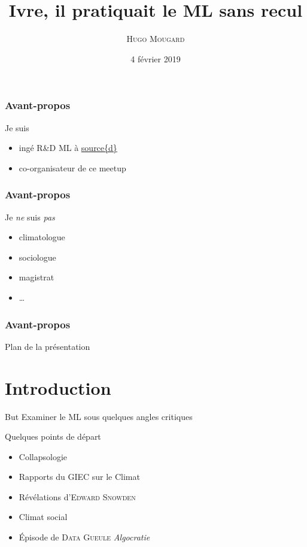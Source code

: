 \documentclass[10pt]{beamer}
\title{Ivre, il pratiquait le ML sans recul}
\subtitle{}
\date{4 février 2019}
\author{\textsc{Hugo Mougard}}
\institute{\textsc{Nantes Machine Learning Meetup}}
\begin{document}
\maketitle

\begin{frame}[standout]
  \frametitle{Avant-propos}
  Je suis

  \begin{itemize}
  \item ingé R\&D ML à \href{https://sourced.tech}{source\{d\}}
  \item co-organisateur de ce meetup
  \end{itemize}
\end{frame}

\begin{frame}[standout]
  \frametitle{Avant-propos}
  Je \emph{ne} suis \emph{pas}

  \begin{itemize}
  \item climatologue
  \item sociologue
  \item magistrat
  \item …
  \end{itemize}
\end{frame}

\begin{frame}[standout]
  \frametitle{Avant-propos}
\end{frame}

\begin{frame}{Plan de la présentation}
  \tableofcontents
\end{frame}

\section{Introduction}
\label{sec:introduction}

\begin{frame}{But}
  Examiner le ML sous quelques angles critiques
\end{frame}

\begin{frame}{Quelques points de départ}
  \begin{itemize}
  \item Collapsologie
  \item Rapports du GIEC sur le Climat
  \item Révélations d'\textsc{Edward Snowden}
  \item Climat social
  \item Épisode de \textsc{Data Gueule} \emph{Algocratie}
  \end{itemize}
\end{frame}
\end{document}
